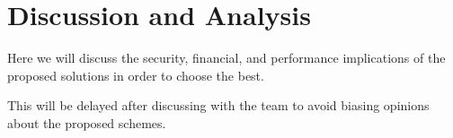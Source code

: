 \section{Discussion and Analysis}
\label{analysis}
Here we will discuss the security, financial, and performance implications of the 
proposed solutions in order to choose the best.


This will be delayed after discussing with the team to avoid biasing opinions 
about the proposed schemes.

